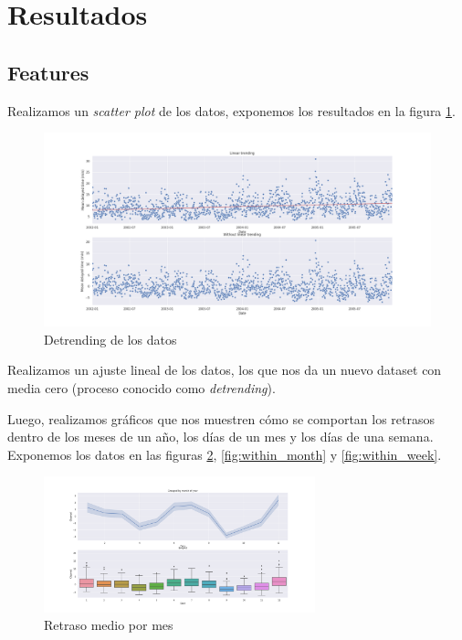 \section{Resultados}\label{sec:resultados}

\subsection{Features}\label{subsec:features}

Realizamos un \textit{scatter plot} de los datos, exponemos los resultados en la figura \ref{fig:trending}.

\begin{figure}[hbtp]
  \centering
  \includegraphics[width=\textwidth]{plots/linear_trending.png}
  \caption{Detrending de los datos}
  \label{fig:trending}
\end{figure}

Realizamos un ajuste lineal de los datos, los que nos da un nuevo dataset con media cero (proceso conocido
como \textit{detrending}).

Luego, realizamos gr\'aficos que nos muestren c\'omo se comportan los retrasos dentro de los meses de un a\~no, los
d\'ias de un mes y los d\'ias de una semana. Exponemos los datos en las figuras \ref{fig:within_year}, \ref{fig:within_month}
y \ref{fig:within_week}.

\begin{figure}[hbtp]
  \centering
  \includegraphics[width=0.7\textwidth]{plots/within_year.png}
  \caption{Retraso medio por mes}
  \label{fig:within_year}
\end{figure}

